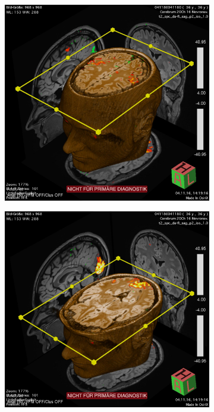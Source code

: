 \documentclass[a4paper]{scrartcl}
\begin{document}
\begin{figure}[hbt]
  \centering
  \begin{subfigure}[c]{0.45\textwidth}
    \includegraphics[width = .9\textwidth]{pictures/tappingLRM.png}
    \label{subfig:se}
  \end{subfigure}
  \centering
  \begin{subfigure}[c]{0.45\textwidth}
    \includegraphics[width = .9\textwidth]{pictures/visualLRM.png}
    \label{subfig:gre}
  \end{subfigure}
\end{figure}
\end{document}
